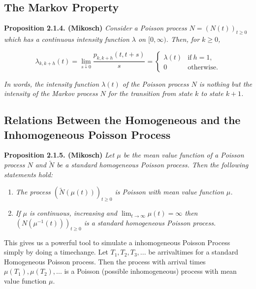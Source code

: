 \documentclass[a4paper,12pt,openany]{book}
\providecommand{\tightlist}{%
 \setlength{\itemsep}{0pt}\setlength{\parskip}{0pt}}
\begin{document}
\hypertarget{the-markov-property}{%
\subsection{The Markov Property}\label{the-markov-property}}

\textbf{Proposition 2.1.4. (Mikosch)} \emph{Consider a Poisson process \(N = (N(t))_{t\ge 0}\) which has a continuous intensity function \(\lambda\) on \([0, \infty)\). Then, for \(k \ge 0\),}

\[
\lambda_{k,k+h}(t)=\lim_{s\downarrow 0}\frac{p_{k,k+h}(t,t+s)}{s}=
\left\{\begin{array}{cc}
\lambda(t) & \text{if}\ h=1 ,\\
0 & \text{otherwise}.
\end{array}\right.
\]

\emph{In words, the intensity function \(\lambda(t)\) of the Poisson process \(N\) is nothing but the intensity of the Markov process \(N\) for the transition from state \(k\) to state \(k + 1\).}

\hypertarget{relations-between-the-homogeneous-and-the-inhomogeneous-poisson-process}{%
\subsection{Relations Between the Homogeneous and the Inhomogeneous Poisson Process}\label{relations-between-the-homogeneous-and-the-inhomogeneous-poisson-process}}

\textbf{Proposition 2.1.5. (Mikosch)} \emph{Let \(\mu\) be the mean value function of a Poisson process \(N\) and \(\tilde{N}\) be a standard homogeneous Poisson process. Then the following statements hold:}

\begin{enumerate}
\def\labelenumi{(\arabic{enumi})}
\tightlist
\item
  \emph{The process \((\tilde{N}(\mu(t)))_{t\ge 0}\) is Poisson with mean value function \(\mu\).}
\item
  \emph{If \(\mu\) is continuous, increasing and \(\lim_{t\to\infty}\mu(t)=\infty\) then \((N(\mu^{-1}(t)))_{t\ge 0}\) is a standard homogeneous Poisson process.}
\end{enumerate}

This gives us a powerful tool to simulate a inhomogeneous Poisson Process simply by doing a timechange. Let \(T_1,T_2,T_3,...\) be arrivaltimes for a standard Homogeneous Poisson process. Then the process with arrival times \(\mu(T_1),\mu(T_2),...\) is a Poisson (possible inhomogeneous) process with mean value function \(\mu\).
\end{document}
